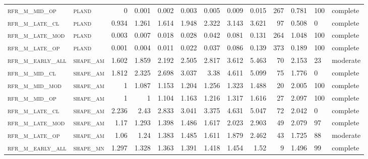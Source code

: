 \begin{landscape}
\begin{center}
\begin{longtable}{llrrrrr|rrr}
\textsc{rfr\_m\_mid\_op   } & \textsc{pland     }   & 0       & 0.001   & 0.002   & 0.003    & 0.005    & 0.009    & 0.015    & 267    & 0.781         & 100           & complete       \\
\textsc{rfr\_m\_late\_cl  } & \textsc{pland     }   & 0.934   & 1.261   & 1.614   & 1.948    & 2.322    & 3.143    & 3.621    & 97     & 0.508         & 0             & complete           \\
\textsc{rfr\_m\_late\_mod } & \textsc{pland     }   & 0.003   & 0.007   & 0.018   & 0.028    & 0.042    & 0.081    & 0.131    & 264    & 1.048         & 100           & complete       \\
\textsc{rfr\_m\_late\_op  } & \textsc{pland     }   & 0.001   & 0.004   & 0.011   & 0.022    & 0.037    & 0.086    & 0.139    & 373    & 0.189         & 100           & complete       \\
\textsc{rfr\_m\_early\_all} & \textsc{shape\_am }   & 1.602   & 1.859   & 2.192   & 2.505    & 2.817    & 3.612    & 5.463    & 70     & 2.153         & 23            & moderate       \\
\textsc{rfr\_m\_mid\_cl   } & \textsc{shape\_am }   & 1.812   & 2.325   & 2.698   & 3.037    & 3.38     & 4.611    & 5.099    & 75     & 1.776         & 0             & complete           \\
\textsc{rfr\_m\_mid\_mod  } & \textsc{shape\_am }   & 1       & 1.087   & 1.153   & 1.204    & 1.256    & 1.323    & 1.488    & 20     & 2.005         & 100           & complete       \\
\textsc{rfr\_m\_mid\_op   } & \textsc{shape\_am }   & 1       & 1       & 1.104   & 1.163    & 1.216    & 1.317    & 1.616    & 27     & 2.097         & 100           & complete       \\
\textsc{rfr\_m\_late\_cl  } & \textsc{shape\_am }   & 2.236   & 2.43    & 2.833   & 3.041    & 3.375    & 4.631    & 5.047    & 72     & 2.042         & 0             & complete           \\
\textsc{rfr\_m\_late\_mod } & \textsc{shape\_am }   & 1.17    & 1.293   & 1.398   & 1.486    & 1.617    & 2.023    & 2.903    & 49     & 2.079         & 97            & complete       \\
\textsc{rfr\_m\_late\_op  } & \textsc{shape\_am }   & 1.06    & 1.24    & 1.383   & 1.485    & 1.611    & 1.879    & 2.462    & 43     & 1.725         & 88            & moderate       \\
\textsc{rfr\_m\_early\_all} & \textsc{shape\_mn }   & 1.297   & 1.328   & 1.363   & 1.391    & 1.418    & 1.454    & 1.52     & 9      & 1.496         & 99            & complete       \\

\end{longtable}
\end{center}
\end{landscape}
